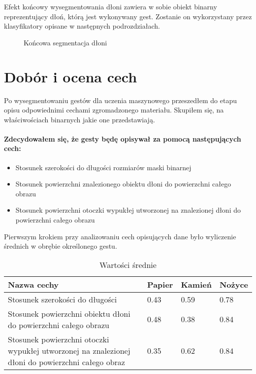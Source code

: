 \documentclass[a4paper,12pt,twoside,openany]{report}
\newcommand{\ImgPath}{.}
\begin{document}
Efekt końcowy wysegmentowania dłoni zawiera w sobie obiekt binarny reprezentujący dłoń, którą jest wykonywany gest. Zostanie on wykorzystany przez klasyfikatory opisane w następnych podrozdziałach.

\begin{figure}[H]
	\centering
	\caption{Końcowa segmentacja dłoni}
\end{figure} 

\section{Dobór i ocena cech}
Po wysegmentowaniu gestów dla uczenia maszynowego przeszedłem do etapu opisu odpowiednimi cechami zgromadzonego materiału. Skupiłem się, na właściwościach binarnych jakie one przedstawiają.

\paragraph{Zdecydowałem się, że gesty będę opisywał za pomocą następujących cech:}
\begin{itemize}
	\item Stosunek szerokości do długości rozmiarów maski binarnej
	\item Stosunek powierzchni znalezionego obiektu dłoni do powierzchni całego obrazu
	\item Stosunek powierzchni otoczki wypukłej utworzonej na znalezionej dłoni do powierzchni całego obrazu
\end{itemize}

Pierwszym krokiem przy analizowaniu cech opisujących dane było wyliczenie średnich w obrębie określonego gestu.

\begin{table}[H]
	\centering
	\begin{tabularx}{\textwidth}{|X|l|l|l|}
		\hline
		\textbf{Nazwa cechy} & \textbf{Papier} & \textbf{Kamień} & \textbf{Nożyce} \\ 
		
		\hline
		Stosunek szerokości do długości & 0.43 & 0.59 & 0.78 \\ 
		
		\hline
		Stosunek powierzchni obiektu dłoni do powierzchni całego obrazu & 0.48 & 0.38 & 0.84 \\ 
		
		\hline
		Stosunek powierzchni otoczki wypukłej utworzonej na znalezionej dłoni do powierzchni całego obraz & 0.35 & 0.62 & 0.84 \\ 
		\hline
	\end{tabularx}

	\caption{Wartości średnie}
\end{table}
\end{document}
